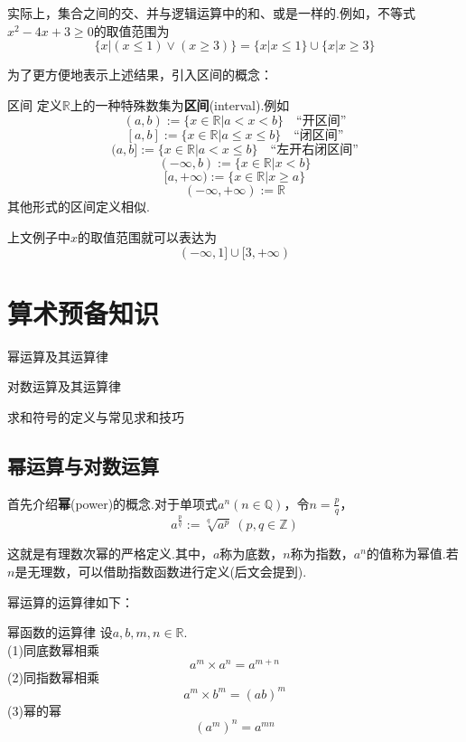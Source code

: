 \documentclass[lang=cn, zihao=5]{elegantbook}
\newcommand{\R}{\mathbb{R}}
\begin{document}
实际上，集合之间的交、并与逻辑运算中的和、或是一样的.例如，不等式$x^2-4x+3 \geq 0$的取值范围为$$\{ x|(x \leq 1) \vee (x \geq 3) \} = \{ x|x \leq 1 \} \cup \{ x|x \geq 3 \}$$

为了更方便地表示上述结果，引入区间的概念：

\begin{definition}{区间}
	定义$\R$上的一种特殊数集为\textbf{区间}(interval).例如 \\
	$$(a,b):=\{ x \in \R | a<x<b \} \quad \textit{“开区间”}$$
	$$[a,b]:=\{ x \in \R | a \leq x \leq b \} \quad \textit{“闭区间”}$$
	$$(a,b]:=\{ x \in \R | a<x \leq b \} \quad \textit{“左开右闭区间”}$$
	$$(-\infty,b):=\{ x \in \R | x<b \}$$
	$$[a,+\infty):=\{ x \in \R | x \geq a \}$$
	$$(-\infty ,+\infty):= \R $$
	其他形式的区间定义相似.
\end{definition}

上文例子中$x$的取值范围就可以表达为$$(-\infty ,1] \cup [3,+\infty )$$


\chapter{算术预备知识}

\begin{introduction}
	\item 幂运算及其运算律
	\item 对数运算及其运算律
	\item 求和符号的定义与常见求和技巧
\end{introduction}

\section{幂运算与对数运算}

首先介绍\textbf{幂}(power)的概念.对于单项式$a^n(n \in \mathbb{Q})$，令$n=\frac{p}{q}$，
$$a^{\frac{p}{q}}:=\sqrt[q]{a^p} \ (p,q \in \mathbb{Z})$$

这就是有理数次幂的严格定义.其中，$a$称为底数，$n$称为指数，$a^n$的值称为幂值.若$n$是无理数，可以借助指数函数进行定义(后文会提到).

幂运算的运算律如下：

\begin{proposition}{幂函数的运算律}
	设$a,b,m,n \in \R $. \\
	(1)同底数幂相乘$$a^m \times a^n = a^{m+n}$$
	(2)同指数幂相乘$$a^m \times b^m = (ab)^m$$
	(3)幂的幂$$(a^m)^n=a^{mn}$$
\end{proposition}
\end{document}
